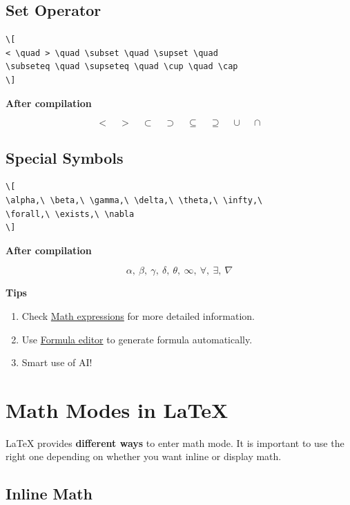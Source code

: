 \documentclass[12pt,a4paper]{article}
\begin{document}
\subsection{Set Operator}

\begin{verbatim}
\[
< \quad > \quad \subset \quad \supset \quad
\subseteq \quad \supseteq \quad \cup \quad \cap
\]
\end{verbatim}

\textbf{After compilation}

\[
< \quad > \quad \subset \quad \supset \quad
\subseteq \quad \supseteq \quad \cup \quad \cap
\]

\subsection{Special Symbols}

\begin{verbatim}
\[
\alpha,\ \beta,\ \gamma,\ \delta,\ \theta,\ \infty,\ 
\forall,\ \exists,\ \nabla
\]
\end{verbatim}

\textbf{After compilation}

\[
\alpha,\ \beta,\ \gamma,\ \delta,\ \theta,\ \infty,\ 
\forall,\ \exists,\ \nabla
\]

\textbf{Tips}

\begin{enumerate}
    \item Check \href{https://www.overleaf.com/learn/latex/Mathematical_expressions}{Math expressions} for more detailed information.
    \item Use \href{https://www.latexlive.com/}{Formula editor} to generate formula automatically.
    \item Smart use of AI!
\end{enumerate}

\section{\color[HTML]{C0392B}Math Modes in LaTeX}

LaTeX provides \textbf{different ways} to enter math mode.
It is important to use the right one depending on whether you want inline or display math.

\subsection{Inline Math}
\end{document}
